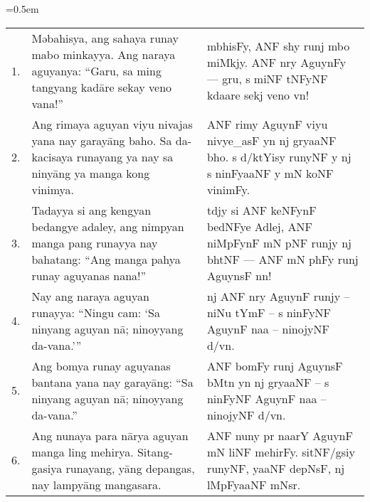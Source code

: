 \documentclass[12pt,paper=a4]{scrartcl}
\begin{document}
\tabulinesep=0.5em
\begin{longtabu} to \linewidth {X[1r] X[12] X[12l]}

1.
	& Məbahisya, ang sahaya runay mabo minkayya. Ang naraya aguyanya: \enquote{Garu, sa ming tangyang kadāre sekay veno vana!}
	& {\Tagati mbhisFy, ANF shy runj mbo miMkjy. ANF nry AguynFy — gru, s miNF tNFyNF kdaare sekj veno vn!}
	\\
	
2.
	& Ang rimaya aguyan viyu nivajas yana nay garayāng baho. Sa da-kacisaya runayang ya nay sa ninyāng ya manga kong vi\-nim\-ya.
	& {\Tagati ANF rimy AguynF viyu nivye\_asF yn nj gryaaNF bho. s d/ktYisy runyNF y nj s ninFyaaNF y mN koNF vinimFy.}
	\\
	
3.
	& Tadayya si ang kengyan bedangye adaley, ang nimpyan manga pang runayya nay bahatang: \enquote{Ang manga pahya runay aguyanas nana!}
	& {\Tagati tdjy si ANF keNFynF bedNFye Adlej, ANF niMpFynF mN pNF runjy nj bhtNF — ANF mN phFy runj AguynsF nn!}
	\\
	
4.
	& Nay ang naraya aguyan runayya: \enquote{Ningu cam: \enquote{Sa ninyang aguyan nā; ninoyyang da-vana.}}
	& {\Tagati nj ANF nry AguynF runjy – niNu tYmF – s ninFyNF AguynF naa – ninojyNF d/vn.}
	\\
	
5.
	& Ang bomya runay aguyanas bantana yana nay garayāng: \enquote{Sa ninyang aguyan nā; ninoyyang da-vana.}
	& {\Tagati ANF bomFy runj AguynsF bMtn yn nj gryaaNF – s ninFyNF AguynF naa – ninojyNF d/vn.}
	\\
	
6.
	& Ang nunaya para nārya aguyan manga ling mehirya. Sitang-gasiya runayang, yāng depangas, nay lampyāng mangasara.
	& {\Tagati ANF nuny pr naarY AguynF mN liNF mehirFy. sitNF/gsiy runyNF, yaaNF depNsF, nj lMpFyaaNF mNsr.}
	\\

\end{longtabu}


\vfill

\begin{multicols}{3}%
\printglossary[style=mysuper,type=\leipzigtype]
\end{multicols}

\printbibliography[heading=none]
\end{document}

